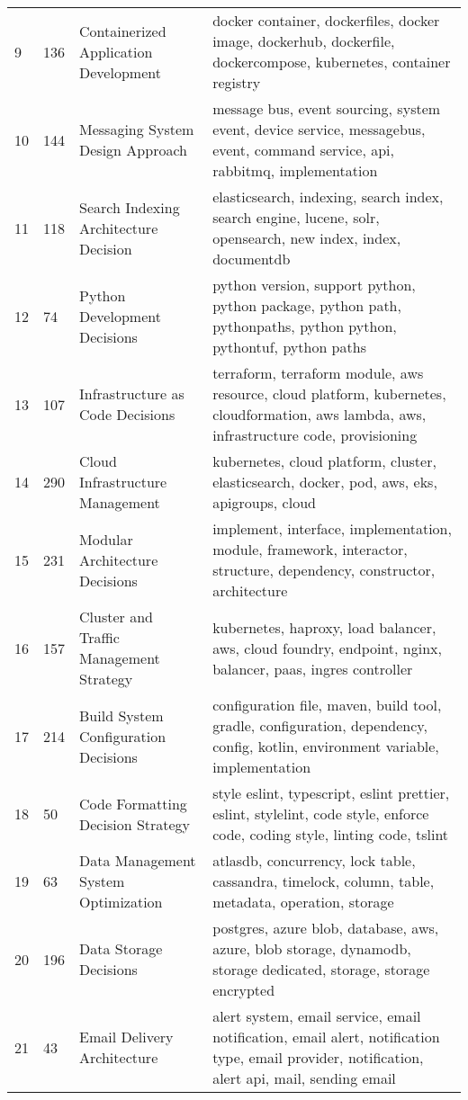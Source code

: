 \begin{longtable}{p{1cm} p{1.12cm} p{3.3cm} p{9cm}}
    9 & 136 & Containerized Application Development & docker container, dockerfiles, docker image, dockerhub, dockerfile, dockercompose, kubernetes, container registry \\
    
    10 & 144 & Messaging System Design Approach & message bus, event sourcing, system event, device service, messagebus, event, command service, api, rabbitmq, implementation \\
    
    11 & 118 & Search Indexing Architecture Decision & elasticsearch, indexing, search index, search engine, lucene, solr, opensearch, new index, index, documentdb \\
    
    12 & 74 & Python Development Decisions & python version, support python, python package, python path, pythonpaths, python python, pythontuf, python paths \\
    
    13 & 107 & Infrastructure as Code Decisions & terraform, terraform module, aws resource, cloud platform, kubernetes, cloudformation, aws lambda, aws, infrastructure code, provisioning \\
    
    14 & 290 & Cloud Infrastructure Management & kubernetes, cloud platform, cluster, elasticsearch, docker, pod, aws, eks, apigroups, cloud \\
    
    15 & 231 & Modular Architecture Decisions & implement, interface, implementation, module, framework, interactor, structure, dependency, constructor, architecture \\
    
    16 & 157 & Cluster and Traffic Management Strategy & kubernetes, haproxy, load balancer, aws, cloud foundry, endpoint, nginx, balancer, paas, ingres controller \\
    
    17 & 214 & Build System Configuration Decisions & configuration file, maven, build tool, gradle, configuration, dependency, config, kotlin, environment variable, implementation \\
    
    18 & 50 & Code Formatting Decision Strategy & style eslint, typescript, eslint prettier, eslint, stylelint, code style, enforce code, coding style, linting code, tslint \\
    
    19 & 63 & Data Management System Optimization & atlasdb, concurrency, lock table, cassandra, timelock, column, table, metadata, operation, storage \\
    
    20 & 196 & Data Storage Decisions & postgres, azure blob, database, aws, azure, blob storage, dynamodb, storage dedicated, storage, storage encrypted \\
    
    21 & 43 & Email Delivery Architecture & alert system, email service, email notification, email alert, notification type, email provider, notification, alert api, mail, sending email \\
    \hline
\end{longtable}